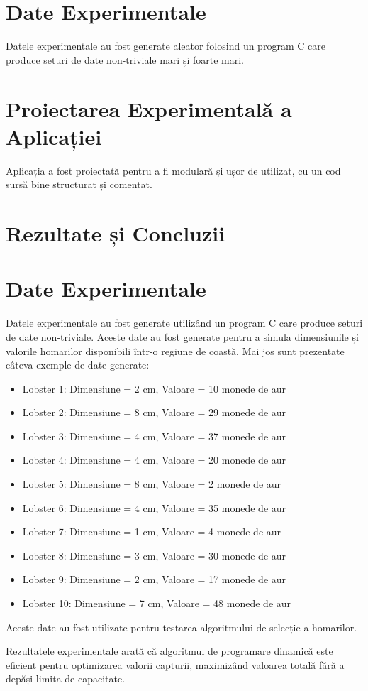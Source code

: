 \documentclass{article}
\begin{document}
\section{Date Experimentale}
Datele experimentale au fost generate aleator folosind un program C care produce seturi de date non-triviale mari și foarte mari.

\section{Proiectarea Experimentală a Aplicației}
Aplicația a fost proiectată pentru a fi modulară și ușor de utilizat, cu un cod sursă bine structurat și comentat.

\section{Rezultate și Concluzii}
\section{Date Experimentale}
Datele experimentale au fost generate utilizând un program C care produce seturi de date non-triviale. Aceste date au fost generate pentru a simula dimensiunile și valorile homarilor disponibili într-o regiune de coastă. Mai jos sunt prezentate câteva exemple de date generate:

\begin{itemize}
  \item Lobster 1: Dimensiune = 2 cm, Valoare = 10 monede de aur
  \item Lobster 2: Dimensiune = 8 cm, Valoare = 29 monede de aur
  \item Lobster 3: Dimensiune = 4 cm, Valoare = 37 monede de aur
  \item Lobster 4: Dimensiune = 4 cm, Valoare = 20 monede de aur
  \item Lobster 5: Dimensiune = 8 cm, Valoare = 2 monede de aur
  \item Lobster 6: Dimensiune = 4 cm, Valoare = 35 monede de aur
  \item Lobster 7: Dimensiune = 1 cm, Valoare = 4 monede de aur
  \item Lobster 8: Dimensiune = 3 cm, Valoare = 30 monede de aur
  \item Lobster 9: Dimensiune = 2 cm, Valoare = 17 monede de aur
  \item Lobster 10: Dimensiune = 7 cm, Valoare = 48 monede de aur
\end{itemize}

Aceste date au fost utilizate pentru testarea algoritmului de selecție a homarilor.

Rezultatele experimentale arată că algoritmul de programare dinamică este eficient pentru optimizarea valorii capturii, maximizând valoarea totală fără a depăși limita de capacitate.
\end{document}
